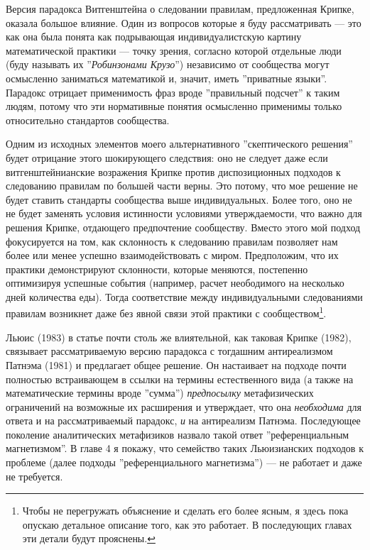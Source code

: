 \documentclass[12pt]{book}
\begin{document}
Версия парадокса Витгенштейна о следовании правилам, предложенная Крипке, оказала большое влияние. Один из вопросов которые я буду рассматривать --- это как она была понята как подрывающая индивидуалистскую картину математической практики --- точку зрения, согласно которой отдельные люди (буду называть их ''\textit{Робинзонами Крузо}'') независимо от сообщества могут осмысленно заниматься математикой и, значит, иметь ''приватные языки''. Парадокс отрицает применимость фраз вроде ''правильный подсчет'' к таким людям, потому что эти нормативные понятия осмысленно применимы только относительно стандартов сообщества.

Одним из исходных элементов моего альтернативного ''скептического решения'' будет отрицание этого шокирующего следствия: оно не следует даже если витгенштейнианские возражения Крипке против диспозиционных подходов к следованию правилам по большей части верны. Это потому, что мое решение не будет ставить стандарты сообщества выше индивидуальных. Более того, оно не не будет заменять условия истинности условиями утверждаемости, что важно для решения Крипке, отдающего предпочтение сообществу. Вместо этого мой подход фокусируется на том, как склонность к следованию правилам позволяет нам более или менее успешно взаимодействовать с миром. Предположим, что их практики демонстрируют склонности, которые меняются, постепенно оптимизируя успешные события (например, расчет неободимого на несколько дней количества еды). Тогда соответствие между индивидуальными следованиями правилам возникнет даже без явной связи этой практики с сообществом\footnote{Чтобы не перегружать объяснение и сделать его более ясным, я здесь пока опускаю детальное описание того, как это работает. В последующих главах эти детали будут прояснены.}.

Льюис (1983) в статье почти столь же влиятельной, как таковая Крипке (1982), связывает рассматриваемую версию парадокса с тогдашним антиреализмом Патнэма (1981) и предлагает общее решение. Он настаивает на подходе почти полностью встраивающем в ссылки на термины естественного вида (а также на математические термины вроде ''сумма'') \textit{предпосылку} метафизических ограничений на возможные их расширения и утверждает, что она \textit{необходима} для ответа и на рассматриваемый парадокс, \textit{и} на антиреализм Патнэма. Последующее поколение аналитических метафизиков назвало такой ответ ''референциальным магнетизмом''. В главе 4 я покажу, что семейство таких Льюизианских подходов к проблеме (далее подходы ''референциального магнетизма'') --- не работает и даже не требуется.
\end{document}
